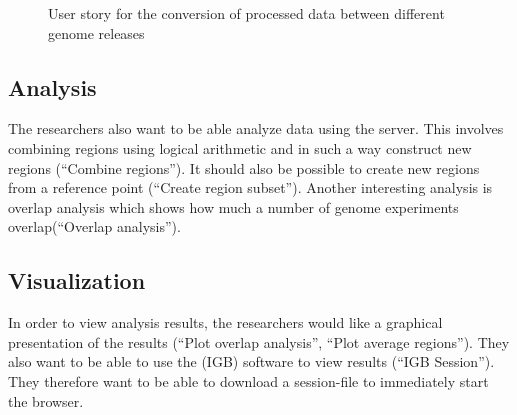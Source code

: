 \begin{figure}[h]
\caption{User story for the conversion of processed data between different genome releases}
\label{fig:target_genome}
\end{figure}

\subsection{Analysis}
The researchers also want to be able analyze data using the server. This involves combining regions using logical arithmetic and in such a way construct new regions (``Combine regions''). It should also be possible to create new regions from a reference point (``Create region subset''). Another interesting analysis is overlap analysis which shows how much a number of genome experiments overlap(``Overlap analysis'').

\subsection{Visualization}
In order to view analysis results, the researchers would like a graphical presentation of the results (``Plot overlap analysis'', ``Plot average regions''). They also want to be able to use the  (IGB)\cite{IGB} software to view results (``IGB Session''). They therefore want to be able to download a session-file to immediately start the browser. 